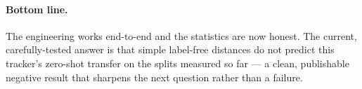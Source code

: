 \documentclass[11pt]{article}
\begin{document}
\paragraph{Bottom line.} The engineering works end-to-end and the statistics are now honest. The current,
carefully-tested answer is that simple label-free distances do not predict this tracker's zero-shot
transfer on the splits measured so far --- a clean, publishable negative result that sharpens the next
question rather than a failure.
\end{document}
